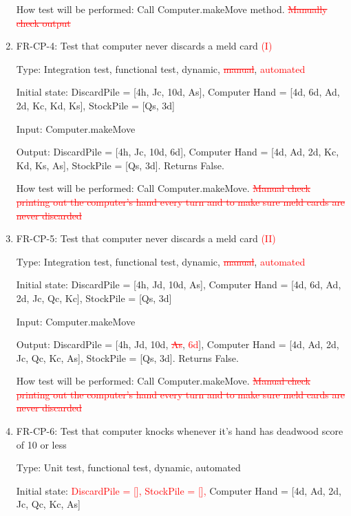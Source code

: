 \documentclass[12pt, titlepage]{article}
\begin{document}
\begin{enumerate}
    How test will be performed: Call Computer.makeMove method. \textcolor{red}{\sout{Manually check output}}
    
    \item{FR-CP-4: Test that computer never discards a meld card \textcolor{red}{(I)}}
    
    Type: Integration test, functional test, dynamic, \textcolor{red}{\sout{manual}}, \textcolor{red}{automated}
    					
    Initial state: DiscardPile = [4h, Jc, 10d, As], Computer Hand = [4d, 6d, Ad, 2d, Kc, Kd, Ks], StockPile = [Qs, 3d]

    Input: Computer.makeMove
    
    Output: DiscardPile = [4h, Jc, 10d, 6d], Computer Hand = [4d, Ad, 2d, Kc, Kd, Ks, As], StockPile = [Qs, 3d]. Returns False.
    					
    How test will be performed: Call Computer.makeMove. \textcolor{red}{\sout{Manual check printing out the computer's hand every turn and to make sure meld cards are never discarded}}

    \item{FR-CP-5: Test that computer never discards a meld card \textcolor{red}{(II)}}
    
    Type: Integration test, functional test, dynamic, \textcolor{red}{\sout{manual}}, \textcolor{red}{automated} 
    					
    Initial state: DiscardPile = [4h, Jd, 10d, As], Computer Hand = [4d, 6d, Ad, 2d, Jc, Qc, Kc], StockPile = [Qs, 3d]

    Input: Computer.makeMove
    
    Output: DiscardPile = [4h, Jd, 10d, \textcolor{red}{\sout{As}}, \textcolor{red}{6d}], Computer Hand = [4d, Ad, 2d, Jc, Qc, Kc, As], StockPile = [Qs, 3d]. Returns False.
    					
    How test will be performed: Call Computer.makeMove. \textcolor{red}{\sout{Manual check printing out the computer's hand every turn and to make sure meld cards are never discarded}}
    
    \item{FR-CP-6: Test that computer knocks whenever it's hand has deadwood score of 10 or less}
    
    Type: Unit test, functional test, dynamic, automated 
    					
    Initial state: \textcolor{red}{DiscardPile = [], StockPile = [],} Computer Hand = [4d, Ad, 2d, Jc, Qc, Kc, As]
    

\end{enumerate}
\end{document}
